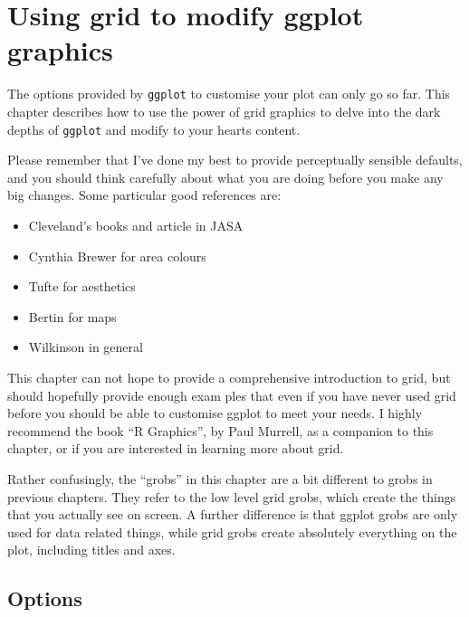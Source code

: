 


\chapter{Using grid to modify ggplot graphics}

The options provided by {\tt ggplot} to customise your plot can only go so far.  This chapter describes how to use the power of grid graphics to delve into the dark depths of {\tt ggplot} and modify to your hearts content.  

Please remember that I've done my best to provide perceptually sensible defaults, and you should think carefully about what you are doing before you make any big changes.  Some particular good references are:

\begin{itemize}
	\item Cleveland's books and article in JASA
	\item Cynthia Brewer for area colours
	\item Tufte for aesthetics
	\item Bertin for maps
	\item Wilkinson in general
\end{itemize}

This chapter can not hope to provide a comprehensive introduction to grid, but should hopefully provide enough exam	ples that even if you have never used grid before you should be able to customise ggplot to meet your needs.  I highly recommend the book ``R Graphics'', by Paul Murrell, as a companion to this chapter, or if you are interested in learning more about grid.   

Rather confusingly, the ``grobs'' in this chapter are a bit different to grobs in previous chapters.  They refer to the low level grid grobs, which create the things that you actually see on screen.  A further difference is that ggplot grobs are only used for data related things, while grid grobs create absolutely everything on the plot, including titles and axes.


\section{Options}\label{sec:options}

